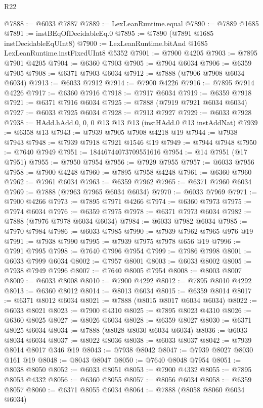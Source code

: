 \begin{lexlean}{R22}
\begin{coremodule}
@7888 := @6033 @7887
@7889 := LexLeanRuntime.equal
@7890 := @7889 @1685
@7891 := instBEqOfDecidableEq.{0}
@7895 := @7890 (@7891 @1685 instDecidableEqUInt8)
@7900 := LexLeanRuntime.bitAnd @1685 LexLeanRuntime.instFixedUInt8 @5352
@7901 := @7900 @4205
@7903 := @7895 @7901 @4205
@7904 := @6360 @7903
@7905 := @7904 @6034
@7906 := @6359 @7905
@7908 := @6371 @7903 @6034
@7912 := @7888 (@7906 @7908 @6034 @6034)
@7913 := @6033 @7912
@7914 := @7900 @4226
@7916 := @7895 @7914 @4226
@7917 := @6360 @7916
@7918 := @7917 @6034
@7919 := @6359 @7918
@7921 := @6371 @7916 @6034
@7925 := @7888 (@7919 @7921 @6034 @6034)
@7927 := @6033 @7925 @6034
@7928 := @7913 @7927
@7929 := @6033 @7928
@7938 := HAdd.hAdd.{0, 0, 0} @13 @13 @13 (instHAdd.{0} @13 instAddNat)
@7939 := @6358 @13
@7943 := @7939 @7905 @7908 @4218 @19
@7944 := @7938 @7943
@7948 := @7939 @7918 @7921 @1546 @19
@7949 := @7944 @7948
@7950 := @7640 @7949
@7951 := 18446744073709551616
@7954 := @14 @7951 (@17 @7951)
@7955 := @7950 @7954
@7956 := @7929 @7955
@7957 := @6033 @7956
@7958 := @7900 @4248
@7960 := @7895 @7958 @4248
@7961 := @6360 @7960
@7962 := @7961 @6034
@7963 := @6359 @7962
@7965 := @6371 @7960 @6034
@7969 := @7888 (@7963 @7965 @6034 @6034)
@7970 := @6033 @7969
@7971 := @7900 @4266
@7973 := @7895 @7971 @4266
@7974 := @6360 @7973
@7975 := @7974 @6034
@7976 := @6359 @7975
@7978 := @6371 @7973 @6034
@7982 := @7888 (@7976 @7978 @6034 @6034)
@7984 := @6033 @7982 @6034
@7985 := @7970 @7984
@7986 := @6033 @7985
@7990 := @7939 @7962 @7965 @976 @19
@7991 := @7938 @7990
@7995 := @7939 @7975 @7978 @656 @19
@7996 := @7991 @7995
@7998 := @7640 @7996 @7954
@7999 := @7986 @7998
@8001 := @6033 @7999 @6034
@8002 := @7957 @8001
@8003 := @6033 @8002
@8005 := @7938 @7949 @7996
@8007 := @7640 @8005 @7954
@8008 := @8003 @8007
@8009 := @6033 @8008
@8010 := @7900 @4292
@8012 := @7895 @8010 @4292
@8013 := @6360 @8012
@8014 := @8013 @6034
@8015 := @6359 @8014
@8017 := @6371 @8012 @6034
@8021 := @7888 (@8015 @8017 @6034 @6034)
@8022 := @6033 @8021
@8023 := @7900 @4310
@8025 := @7895 @8023 @4310
@8026 := @6360 @8025
@8027 := @8026 @6034
@8028 := @6359 @8027
@8030 := @6371 @8025 @6034
@8034 := @7888 (@8028 @8030 @6034 @6034)
@8036 := @6033 @8034 @6034
@8037 := @8022 @8036
@8038 := @6033 @8037
@8042 := @7939 @8014 @8017 @346 @19
@8043 := @7938 @8042
@8047 := @7939 @8027 @8030 @161 @19
@8048 := @8043 @8047
@8050 := @7640 @8048 @7954
@8051 := @8038 @8050
@8052 := @6033 @8051
@8053 := @7900 @4332
@8055 := @7895 @8053 @4332
@8056 := @6360 @8055
@8057 := @8056 @6034
@8058 := @6359 @8057
@8060 := @6371 @8055 @6034
@8064 := @7888 (@8058 @8060 @6034 @6034)

\end{coremodule}
\end{lexlean}
